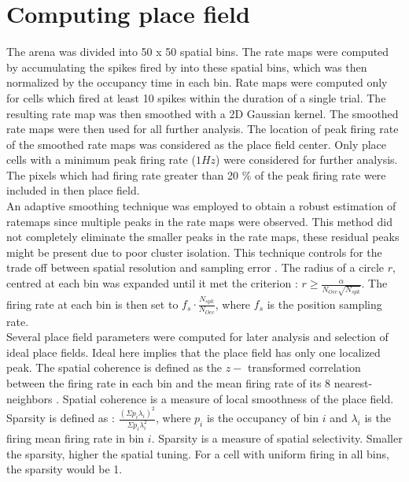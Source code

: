 \section{Computing place field}
\label{pfcompute}
The arena was divided into 50 x 50 spatial bins. The rate maps were computed by accumulating the spikes fired by into these spatial bins, which was then normalized by the occupancy time in each bin.
Rate maps were computed only for cells which fired at least 10 spikes within the duration of a single trial. The resulting rate map was then smoothed with a 2D Gaussian kernel. The smoothed rate maps were then used for all further analysis. The location of peak firing rate of the smoothed rate maps was considered as the place field center. Only place cells with a minimum peak firing rate ($1Hz$) were considered for further analysis. The pixels which had firing rate greater than 20 $\%$ of the peak firing rate were included in then place field.\\ 
An adaptive smoothing technique was employed to obtain a robust estimation of ratemaps since multiple peaks in the rate maps were observed. This method did not completely eliminate the smaller peaks in the rate maps, these residual peaks might be present due to poor cluster isolation. This technique controls for the trade off between spatial resolution and sampling error \cite{Skaggs1996c}. The radius of a circle $r$, centred at each bin was expanded until it met the criterion :   $ r \geq \frac{\alpha}{N_{Occ} \sqrt{N_{spk}}}$. The firing rate at each bin is then set to $f_{s} \cdot \frac{N_{spk}}{N_{Occ}}$, where $f_{s}$ is the position sampling rate.\\
Several place field parameters were computed for later analysis and selection of ideal place fields. Ideal here implies that the place field has only one localized peak. The spatial coherence is defined as the $z-$ transformed correlation between the firing rate in each bin and the mean firing rate of its 8 nearest-neighbors \cite{Muller1989}. Spatial coherence is a measure of local smoothness of the place field.\\
Sparsity is defined as : $\frac{(\Sigma p_{i} \lambda_{i})^{2}}{\Sigma p_{i} \lambda^{2}_{i}}$, where $p_{i}$ is the occupancy of bin $i$ and $\lambda_{i}$ is the firing mean firing rate in bin $i$. Sparsity is a measure of spatial selectivity. Smaller the sparsity, higher the spatial tuning. For a cell with uniform firing in all bins, the sparsity would be 1. \\

